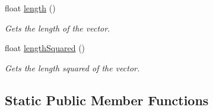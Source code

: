 \begin{DoxyCompactItemize}
float \hyperlink{classflounder_1_1vector2_a0d8e945760ad8ebc6b72ee7865e44cb9}{length} ()
\begin{DoxyCompactList}\small\item\em Gets the length of the vector. \end{DoxyCompactList}\item 
float \hyperlink{classflounder_1_1vector2_a67c4e72415ec236a166e8627c5d76851}{length\+Squared} ()
\begin{DoxyCompactList}\small\item\em Gets the length squared of the vector. \end{DoxyCompactList}\end{DoxyCompactItemize}
\subsection*{Static Public Member Functions}
